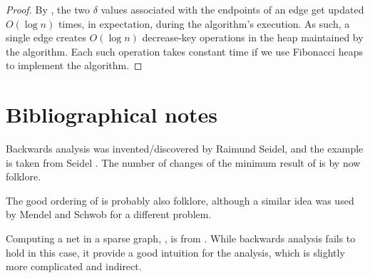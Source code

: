 \begin{proof}
    By , the two $\delta$ values associated with
    the endpoints of an edge get updated $O( \log n)$ times, in
    expectation, during the algorithm's execution. As such, a single
    edge creates $O(\log n)$ decrease-key operations in the heap
    maintained by the algorithm. Each such operation takes constant
    time if we use Fibonacci heaps to implement the algorithm.
\end{proof}%

\section{Bibliographical notes}

Backwards analysis was invented/discovered by Raimund Seidel, and the
\QuickSort example is taken from Seidel \cite{s-barga-93}.  The number
of changes of the minimum result of  is by now
folklore.

The good ordering of  is probably also folklore,
although a similar idea was used by Mendel and Schwob
\cite{ms-fckrp-09} for a different problem.

Computing a net in a sparse graph, , is from
\cite{ehs-ogpcd-14}. While backwards analysis fails to hold in this
case, it provide a good intuition for the analysis, which is slightly
more complicated and indirect.


\ChapterEnd{}
% 

